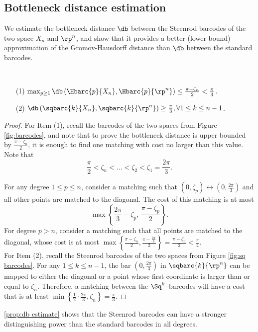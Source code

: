 \subsection{Bottleneck distance estimation}

We estimate the bottleneck distance $\db$ between the Steenrod barcodes of the two space $X_n$ and $\rp^n$, and show that it provides a better (lower-bound) approximation of the Gromov-Hausdorff distance than $\db$ between the standard barcodes.

\begin{theorem}\label{prop:db estimate}
	\ \par
	\begin{itemize}
		\item[(1)] $\max_{p\geq 1}\db\left(\Hbarc{p}{X_n}, \Hbarc{p}{\rp^n}\right)\leq \frac{\pi-\zeta_n}{2}<\frac{\pi}{4}$.
		\smallskip\item[(2)] $\db\left(\sqbarc{k}{X_n}, \sqbarc{k}{\rp^n}\right)\geq \frac{\pi}{3},\forall 1\leq k\leq n-1$.
	\end{itemize}
\end{theorem}

\begin{proof}
	For Item (1), recall the barcodes of the two spaces from Figure \ref{fig:barcodes}, and note that to prove the bottleneck distance is upper bounded by $\frac{\pi-\zeta_n}{2}$, it is enough to find one matching with cost no larger than this value. Note that
	\[\frac{\pi}{2}<\zeta_n<\dots<\zeta_2<\zeta_1 =\frac{2\pi}{3}.\]

	For any degree $1\leq p\leq n$, consider a matching such that $(0,\zeta_p)\leftrightarrow \left(0,\frac{2\pi}{3}\right)$ and all other points are matched to the diagonal. The cost of this matching is at most
	\[\max\left\{\frac{2\pi}{3}-\zeta_p,\,\frac{\pi-\zeta_p}{2}\right\}.\]
	For degree $p>n$, consider a matching such that all points are matched to the diagonal, whose cost is at most $\max\left\{ \frac{\pi-\zeta_n}{2}, \frac{\pi-\frac{2\pi}{3}}{2}\right\} = \frac{\pi-\zeta_n}{2}<\frac{\pi}{4}.$ \\

	For Item (2), recall the Steenrod barcodes of the two spaces from Figure \ref{fig:sq barcodes}. For any $1\leq k\leq n-1$, the bar $\left(0,\frac{2\pi}{3}\right)$ in $\sqbarc{k}{\rp^n}$ can be mapped to either the diagonal or a point whose first coordinate is larger than or equal to $\zeta_n$. Therefore, a matching between the $\Sq^k$--barcodes will have a cost that is at least $\min\left\{\frac{1}{2}\cdot\frac{2\pi}{3}, \zeta_n\right\} = \frac{\pi}{3}.$
\end{proof}

\cref{prop:db estimate} shows that the Steenrod barcodes can have a stronger distinguishing power than the standard barcodes in all degrees.